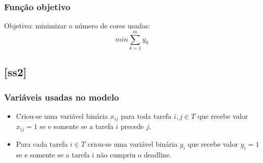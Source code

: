 \documentclass[11pt,letterpaper]{article}
\begin{document}
\subsubsection*{Função objetivo}
Objetivo: minimizar o número de cores usadas:
\begin{equation}
min\sum_{k=1}^{m}y_k
\end{equation}


\subsection{{[}ss2{]}}
\subsubsection*{Variáveis usadas no modelo}
\begin{itemize}
\item Criou-se uma variável binária $x_{ij}$ para toda tarefa $i, j
  \in T$ que recebe valor $x_{ij}=1$ se e somente se a
tarefa $i$ precede $j$.

\item Para cada tarefa $i \in T$ criou-se uma variável binária $y_{i}$
  que recebe valor $y_{i}=1$ se e somente se a tarefa i não cumpriu o deadline.
\end{itemize}
\end{document}
